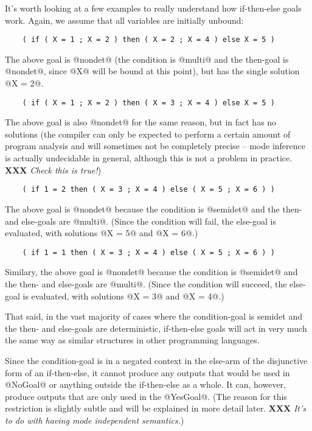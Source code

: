 \documentclass[a4paper,11pt,notitlepage,onecolumn]{article}
\newcommand{\XXX}[1]%
{{\small\textbf{XXX} \emph{#1}}}
\begin{document}
It's worth looking at a few examples to really understand how
if-then-else goals work.  Again, we assume that all variables
are initially unbound:
\begin{verbatim}
    ( if ( X = 1 ; X = 2 ) then ( X = 2 ; X = 4 ) else X = 5 )
\end{verbatim}
The above goal is @nondet@ (the condition is @multi@
and the then-goal is @nondet@, since @X@ will be bound at this point),
but has the single solution @X = 2@.
\begin{verbatim}
    ( if ( X = 1 ; X = 2 ) then ( X = 3 ; X = 4 ) else X = 5 )
\end{verbatim}
The above goal is also @nondet@ for the same reason, but in fact has no
solutions (the compiler can only be expected to perform a certain amount
of program analysis and will sometimes not be completely precise --
mode inference is actually undecidable in general, although this is not
a problem in practice.  \XXX{Check this is true!})
\begin{verbatim}
    ( if 1 = 2 then ( X = 3 ; X = 4 ) else ( X = 5 ; X = 6 ) )
\end{verbatim}
The above goal is @nondet@ because the condition is @semidet@ and the
then- and else-goals are
@multi@.  (Since the condition will fail, the
else-goal is evaluated, with solutions @X = 5@ and @X = 6@.)
\begin{verbatim}
    ( if 1 = 1 then ( X = 3 ; X = 4 ) else ( X = 5 ; X = 6 ) )
\end{verbatim}
Similary, the above goal is @nondet@ because the condition is @semidet@
and the then- and else-goals are
@multi@.  (Since the condition will succeed, the
else-goal is evaluated, with solutions @X = 3@ and @X = 4@.)

That said, in the vast majority of cases where the
condition-goal is semidet and the then- and else-goals are
deterministic, if-then-else goals will act in very much the
same way as similar structures in other programming languages.

Since the condition-goal is in a negated context in the else-arm
of the disjunctive form of an if-then-else, it cannot
produce any outputs that would be used in @NoGoal@ or anything
outside the if-then-else as a whole.  It can, however, produce
outputs that are only used in the @YesGoal@.  (The reason for
this restriction is slightly subtle and will be explained in
more detail later.  \XXX{It's to do with having mode
independent semantics.})
\end{document}
